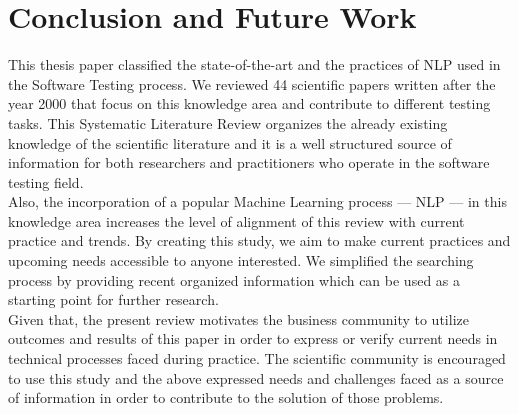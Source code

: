 \chapter{Conclusion and Future Work}

This thesis paper classified the state-of-the-art and the practices of NLP used in the Software Testing process. We reviewed 44 scientific papers written after the year 2000 that focus on this 
knowledge area and contribute to different testing tasks. This Systematic Literature Review organizes the already existing knowledge of the scientific literature and it is a well structured source of 
information for both researchers and practitioners who operate in the software testing field.\\

Also, the incorporation of a popular Machine Learning process --- NLP --- in this knowledge area increases the level of alignment of this review with current practice and trends. By creating this study, 
we aim to make current practices and upcoming needs accessible to anyone interested. We simplified the searching process by providing recent organized information which can be used as a starting point 
for further research.\\

Given that, the present review motivates the business community to utilize outcomes and results of this paper in order to express or verify current needs in technical processes faced during practice. The 
scientific community is encouraged to use this study and the above expressed needs and challenges faced as a source of information in order to contribute to the solution of those problems.
